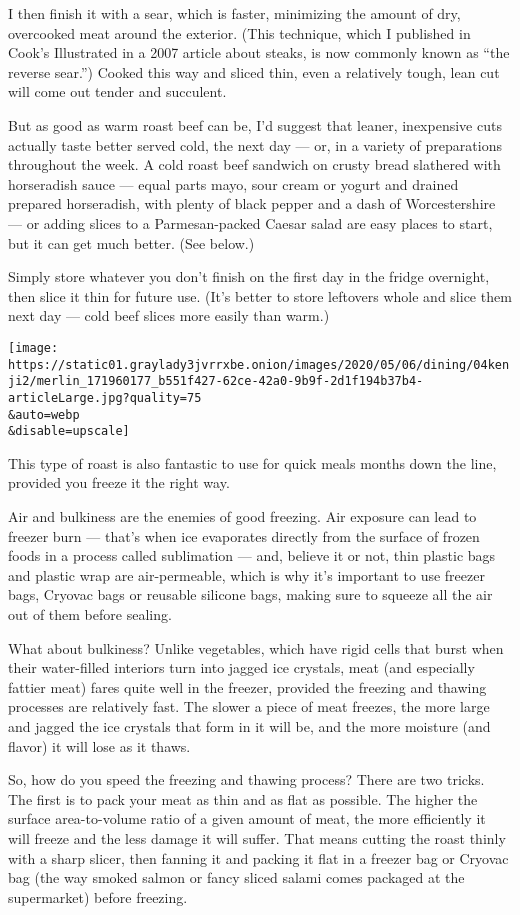 I then finish it with a sear, which is faster, minimizing the amount of
dry, overcooked meat around the exterior. (This technique, which I
published in Cook's Illustrated in a 2007 article about steaks, is now
commonly known as ``the reverse sear.'') Cooked this way and sliced
thin, even a relatively tough, lean cut will come out tender and
succulent.

But as good as warm roast beef can be, I'd suggest that leaner,
inexpensive cuts actually taste better served cold, the next day --- or,
in a variety of preparations throughout the week. A cold roast beef
sandwich on crusty bread slathered with horseradish sauce --- equal
parts mayo, sour cream or yogurt and drained prepared horseradish, with
plenty of black pepper and a dash of Worcestershire --- or adding slices
to a Parmesan-packed Caesar salad are easy places to start, but it can
get much better. (See below.)

Simply store whatever you don't finish on the first day in the fridge
overnight, then slice it thin for future use. (It's better to store
leftovers whole and slice them next day --- cold beef slices more easily
than warm.)

\texttt{[image: https://static01.graylady3jvrrxbe.onion/images/2020/05/06/dining/04kenji2/merlin\_171960177\_b551f427-62ce-42a0-9b9f-2d1f194b37b4-articleLarge.jpg?quality=75\\\&auto=webp\\\&disable=upscale]}

This type of roast is also fantastic to use for quick meals months down
the line, provided you freeze it the right way.

Air and bulkiness are the enemies of good freezing. Air exposure can
lead to freezer burn --- that's when ice evaporates directly from the
surface of frozen foods in a process called sublimation --- and, believe
it or not, thin plastic bags and plastic wrap are air-permeable, which
is why it's important to use freezer bags, Cryovac bags or reusable
silicone bags, making sure to squeeze all the air out of them before
sealing.

What about bulkiness? Unlike vegetables, which have rigid cells that
burst when their water-filled interiors turn into jagged ice crystals,
meat (and especially fattier meat) fares quite well in the freezer,
provided the freezing and thawing processes are relatively fast. The
slower a piece of meat freezes, the more large and jagged the ice
crystals that form in it will be, and the more moisture (and flavor) it
will lose as it thaws.

So, how do you speed the freezing and thawing process? There are two
tricks. The first is to pack your meat as thin and as flat as possible.
The higher the surface area-to-volume ratio of a given amount of meat,
the more efficiently it will freeze and the less damage it will suffer.
That means cutting the roast thinly with a sharp slicer, then fanning it
and packing it flat in a freezer bag or Cryovac bag (the way smoked
salmon or fancy sliced salami comes packaged at the supermarket) before
freezing.

